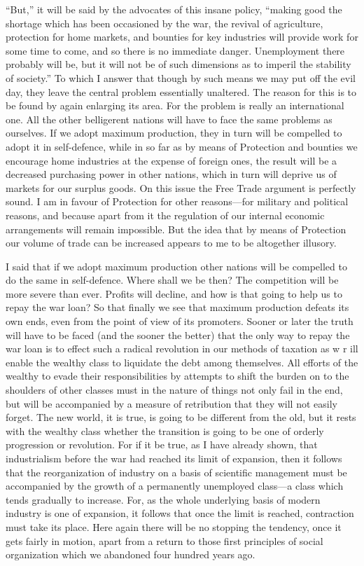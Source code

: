 \documentclass{book}
\begin{document}
“But,” it will be said by the advocates of this insane policy, “making good the shortage which has been occasioned by the war, the revival of agriculture, protection for home markets, and bounties for key industries will provide work for some time to come, and so there is no immediate danger. Unemployment there probably will be, but it will not be of such dimensions as to imperil the stability of society.” To which I answer that though by such means we may put off the evil day, they leave the central problem essentially unaltered. The reason for this is to be found by again enlarging its area. For the problem is really an international one. All the other belligerent nations will have to face the same problems as ourselves. If we adopt maximum production, they in turn will be compelled to adopt it in self-defence, while in so far as by means of Protection and bounties we encourage home industries at the expense of foreign ones, the result will be a decreased purchasing power in other nations, which in turn will deprive us of markets for our surplus goods. On this issue the Free Trade argument is perfectly sound. I am in favour of Protection for other reasons—for military and political reasons, and because apart from it the regulation of our internal economic arrangements will remain impossible. But the idea that by means of Protection our volume of trade can be increased appears to me to be altogether illusory.

I said that if we adopt maximum production other nations will be compelled to do the same in self-defence. Where shall we be then? The competition will be more severe than ever. Profits will decline, and how is that going to help us to repay the war loan? So that finally we see that maximum production defeats its own ends, even from the point of view of its promoters. Sooner or later the truth will have to be faced (and the sooner the better) that the only way to repay the war loan is to effect such a radical revolution in our methods of taxation as w r ill enable the wealthy class to liquidate the debt among themselves. All efforts of the wealthy to evade their responsibilities by attempts to shift the burden on to the shoulders of other classes must in the nature of things not only fail in the end, but will be accompanied by a measure of retribution that they will not easily forget. The new world, it is true, is going to be different from the old, but it rests with the wealthy class whether the transition is going to be one of orderly progression or revolution. For if it be true, as I have already shown, that industrialism before the war had reached its limit of expansion, then it follows that the reorganization of industry on a basis of scientific management must be accompanied by the growth of a permanently unemployed class—a class which tends gradually to increase. For, as the whole underlying basis of modern industry is one of expansion, it follows that once the limit is reached, contraction must take its place. Here again there will be no stopping the tendency, once it gets fairly in motion, apart from a return to those first principles of social organization which we abandoned four hundred years ago.
\end{document}

